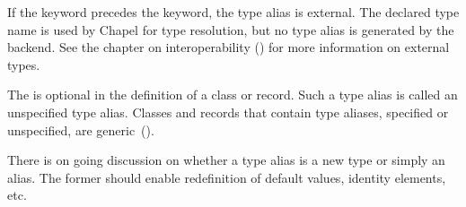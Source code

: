 If the keyword  precedes the  keyword, the type alias is
external.  The declared type name is used by Chapel for type resolution, but no
type alias is generated by the backend.  See the chapter on interoperability
() for more information on external types.

The  is optional in the definition of a class or
record.  Such a type alias is called an unspecified type
alias. Classes and records that contain type aliases, specified or
unspecified, are generic~().

\begin{openissue}
There is on going discussion on whether a type alias is a new
type or simply an alias.  The former should enable redefinition of
default values, identity elements, etc.
\end{openissue}
